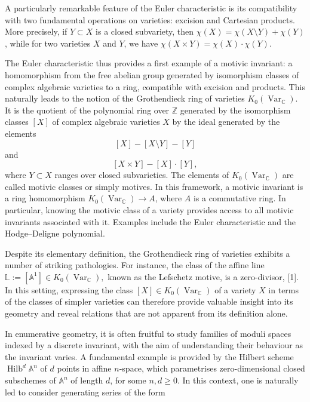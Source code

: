 A particularly remarkable feature of the
Euler characteristic is its compatibility
with two fundamental operations on varieties:
excision and Cartesian products. More
precisely, if $Y\subset X$ is a closed
subvariety, then $\chi(X)=\chi(X\setminus
Y)+\chi(Y)$, while for two varieties $X$ and
$Y$, we have $\chi(X\times
Y)=\chi(X)\cdot\chi(Y)$.

The Euler characteristic thus provides a
first example of a motivic invariant: a
homomorphism from the free abelian group
generated by isomorphism classes of complex
algebraic varieties to a ring, compatible
with excision and products. This naturally
leads to the notion of the Grothendieck ring
of varieties
$K_0(\operatorname{Var}_{\mathbb{C}})$. It is
the quotient of the polynomial ring over
$\mathbb{Z}$ generated by the isomorphism
classes $[X]$ of complex algebraic varieties
$X$ by the ideal generated by the elements
$$
[X]-[X\setminus Y]-[Y]
$$
and
$$
[X\times Y]-[X]\cdot[Y],
$$
where $Y\subset X$ ranges over closed
subvarieties. The elements of
$K_0(\operatorname{Var}_{\mathbb{C}})$ are
called motivic classes or simply motives. In
this framework, a motivic invariant is a ring
homomorphism
$K_0(\operatorname{Var}_{\mathbb{C}})
\longrightarrow A$, where $A$ is a
commutative ring. In particular, knowing the
motivic class of a variety provides access to
all motivic invariants associated with it.
Examples include the Euler characteristic and
the Hodge--Deligne polynomial.

Despite its elementary definition, the
Grothendieck ring of varieties exhibits a
number of striking pathologies. For instance,
the class of the affine line
$\mathbb{L}:=[\mathbb{A}^1]\in
K_0(\operatorname{Var}_{\mathbb{C}}),$ known
as the Lefschetz motive, is a zero-divisor,
[1]. In this setting, expressing the class
$[X]\in K_0(\operatorname{Var}_{\mathbb{C}})$
of a variety $X$ in terms of the classes of
simpler varieties can therefore provide
valuable insight into its geometry and reveal
relations that are not apparent from its
definition alone.

In enumerative geometry, it is often fruitful
to study families of moduli spaces indexed by
a discrete invariant, with the aim of
understanding their behaviour as the
invariant varies. A fundamental example is
provided by the Hilbert scheme
$\operatorname{Hilb}^d\mathbb{A}^n$ of $d$
points in affine $n$-space, which
parametrises zero-dimensional closed
subschemes of $\mathbb{A}^n$ of length $d$,
for some $n,d\ge 0$. In this context, one is
naturally led to consider generating series
of the form


